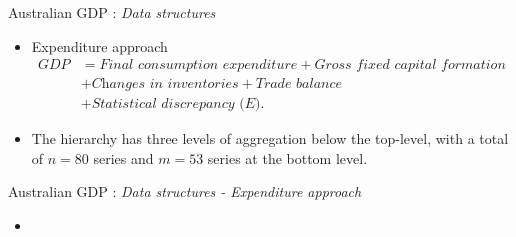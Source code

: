 \documentclass[11pt,xcolor=dvipsnames,table]{beamer} %
\begin{document}

\begin{frame}{Australian GDP : \textit{Data structures}}
\begin{itemize}[<+-| alert@+>]
	\item[] 
	
	\begin{block}{Expenditure approach}
		\begin{align*}
		\textit{GDP}
		& = \textit{Final consumption expenditure}
		+ \textit{Gross fixed capital formation} \\
		& + \textit{Changes in inventories}
		+ \textit{Trade balance}\\
		&+ \textit{Statistical discrepancy (E)}.
		\end{align*}
	\end{block}
	
	\item The hierarchy has three levels of aggregation below the top-level, with a total of $n=80$ series and $m=53$ series at the bottom level.
	
\end{itemize}
\end{frame}



\begin{frame}{Australian GDP : \textit{Data structures - Expenditure approach}}
\begin{itemize}[<+-| alert@+>]
\item[] 
\begin{figure}
	\vspace{-0.7cm}
\end{figure}	

\end{itemize}
\end{frame}
\end{document}
